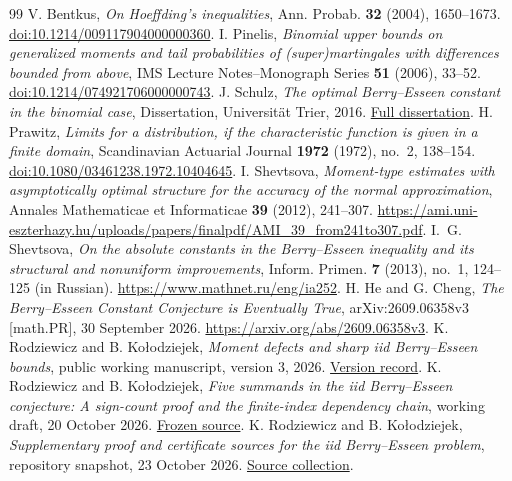 \documentclass[aop,preprint]{imsart}
\theoremstyle{definition}
\numberwithin{equation}{section}
\begin{document}
\appendix






\begin{thebibliography}{99}
V. Bentkus, \emph{On Hoeffding's inequalities},
Ann. Probab. \textbf{32} (2004), 1650--1673.
\href{https://doi.org/10.1214/009117904000000360}{doi:10.1214/009117904000000360}.
I. Pinelis, \emph{Binomial upper bounds on generalized moments and tail
probabilities of (super)martingales with differences bounded from above},
IMS Lecture Notes--Monograph Series \textbf{51} (2006), 33--52.
\href{https://doi.org/10.1214/074921706000000743}{doi:10.1214/074921706000000743}.
J. Schulz, \emph{The optimal Berry--Esseen constant in the binomial case},
Dissertation, Universit\"at Trier, 2016.
\href{https://d-nb.info/1197702695/34}{Full dissertation}.
H. Prawitz, \emph{Limits for a distribution, if the characteristic
function is given in a finite domain}, Scandinavian Actuarial Journal
\textbf{1972} (1972), no.~2, 138--154.
\href{https://doi.org/10.1080/03461238.1972.10404645}{doi:10.1080/03461238.1972.10404645}.
I. Shevtsova, \emph{Moment-type estimates with asymptotically optimal
structure for the accuracy of the normal approximation},
Annales Mathematicae et Informaticae \textbf{39} (2012), 241--307.
\url{https://ami.uni-eszterhazy.hu/uploads/papers/finalpdf/AMI_39_from241to307.pdf}.
I.~G. Shevtsova, \emph{On the absolute constants in the Berry--Esseen
inequality and its structural and nonuniform improvements},
Inform. Primen. \textbf{7} (2013), no.~1, 124--125 (in Russian).
\url{https://www.mathnet.ru/eng/ia252}.
H. He and G. Cheng, \emph{The Berry--Esseen Constant Conjecture is
Eventually True}, arXiv:2609.06358v3 [math.PR], 30 September 2026.
\url{https://arxiv.org/abs/2609.06358v3}.
K. Rodziewicz and B. Ko\l{}odziejek,
\emph{Moment defects and sharp iid Berry--Esseen bounds},
public working manuscript, version 3, 2026.
\href{https://hexagonmath.org/2610.00147v3}{Version record}.
K. Rodziewicz and B. Ko\l{}odziejek,
\emph{Five summands in the iid Berry--Esseen conjecture:
A sign-count proof and the finite-index dependency chain},
working draft, 20 October 2026.
\href{https://github.com/rodziewiczk/berry-esseen-045-certificate/blob/75a94708872e2bc053f42a279559b23ed91e4402/moment-defects/five-summands-2026-10-20/manuscript.tex}{Frozen source}.
K. Rodziewicz and B. Ko\l{}odziejek,
\emph{Supplementary proof and certificate sources for the iid
Berry--Esseen problem}, repository snapshot, 23 October 2026.
\href{https://github.com/rodziewiczk/berry-esseen-045-certificate/tree/75a94708872e2bc053f42a279559b23ed91e4402}{Source collection}.
\end{thebibliography}
\end{document}
